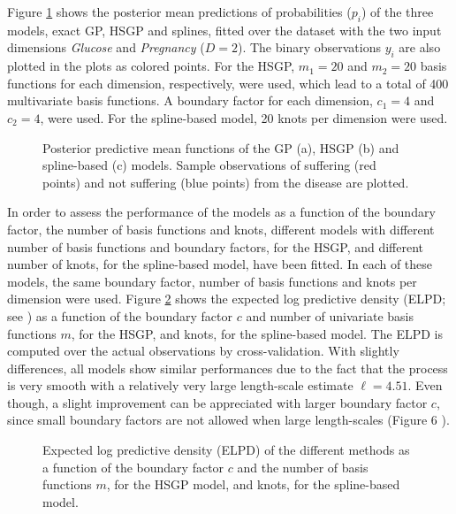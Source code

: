 \documentclass[onecolumn,a4paper,11pt]{article}
\begin{document}
Figure \ref{ch5_fig18_gpfun_diabetes} shows the posterior mean predictions of probabilities ($p_i$) of the three models, exact GP, HSGP and splines, fitted over the dataset with the two input dimensions \textit{Glucose} and \textit{Pregnancy} ($D=2$). The binary observations $y_i$ are also plotted in the plots as colored points. For the HSGP, $m_1=20$ and $m_2=20$ basis functions for each dimension, respectively, were used, which lead to a total of 400 multivariate basis functions. A boundary factor for each dimension, $c_1=4$ and $c_2=4$, were used. For the spline-based model, 20 knots per dimension were used.
%
\begin{figure}
\centering
{}
\caption{Posterior predictive mean functions of the GP (a), HSGP (b) and spline-based (c) models. Sample observations of suffering (red points) and not suffering (blue points) from the disease are plotted.}
  \label{ch5_fig18_gpfun_diabetes}
\end{figure}

In order to assess the performance of the models as a function of the boundary factor, the number of basis functions and knots, different models with different number of basis functions and boundary factors, for the HSGP, and different number of knots, for the spline-based model, have been fitted. In each of these models, the same boundary factor, number of basis functions and knots per dimension were used. Figure \ref{ch5_fig19_ELPD_diabetes} shows the expected log predictive density (ELPD; see \cite{vehtari_2012}) as a function of the boundary factor $c$ and number of univariate basis functions $m$, for the HSGP, and knots, for the spline-based model. The ELPD is computed over the actual observations by cross-validation. With slightly differences, all models show similar performances due to the fact that the process is very smooth with a relatively very large length-scale estimate $\ell=4.51$. Even though, a slight improvement can be appreciated with larger boundary factor $c$, since small boundary factors are not allowed when large length-scales (Figure 6%
).
%
\begin{figure}
\centering
{}
\caption{Expected log predictive density (ELPD) of the different methods as a function of the boundary factor $c$ and the number of basis functions $m$, for the HSGP model, and knots, for the spline-based model.}
  \label{ch5_fig19_ELPD_diabetes}
\end{figure}
\end{document}
